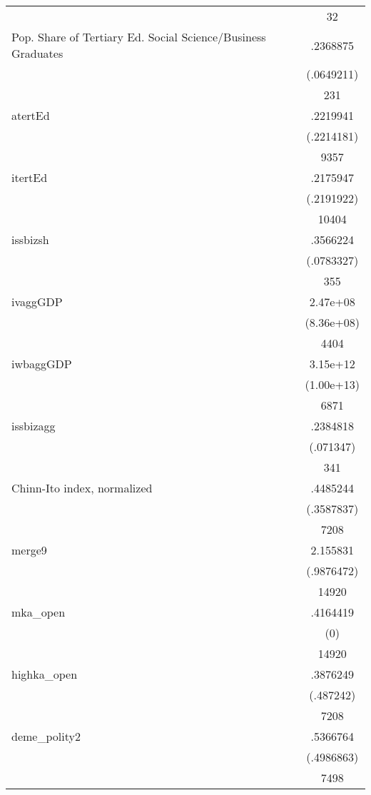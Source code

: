 {\begin{longtable}{l*{1}{c}}
                    &          32\\
Pop. Share of Tertiary Ed. Social Science/Business Graduates&    .2368875\\
                    &  (.0649211)\\
                    &         231\\
atertEd             &    .2219941\\
                    &  (.2214181)\\
                    &        9357\\
itertEd             &    .2175947\\
                    &  (.2191922)\\
                    &       10404\\
issbizsh            &    .3566224\\
                    &  (.0783327)\\
                    &         355\\
ivaggGDP            &    2.47e+08\\
                    &  (8.36e+08)\\
                    &        4404\\
iwbaggGDP           &    3.15e+12\\
                    &  (1.00e+13)\\
                    &        6871\\
issbizagg           &    .2384818\\
                    &   (.071347)\\
                    &         341\\
Chinn-Ito index, normalized&    .4485244\\
                    &  (.3587837)\\
                    &        7208\\
merge9              &    2.155831\\
                    &  (.9876472)\\
                    &       14920\\
mka\_open            &    .4164419\\
                    &         (0)\\
                    &       14920\\
highka\_open         &    .3876249\\
                    &   (.487242)\\
                    &        7208\\
deme\_polity2        &    .5366764\\
                    &  (.4986863)\\
                    &        7498\\
\hline\hline
\end{longtable}
}
